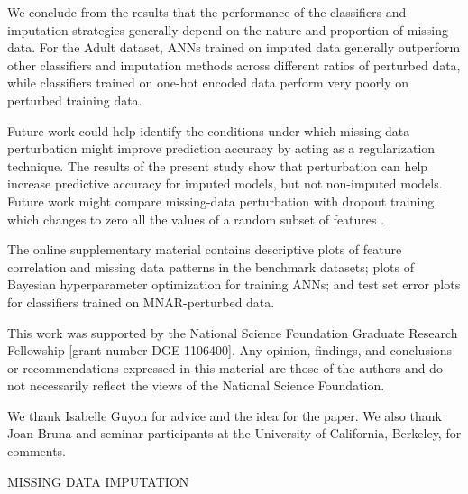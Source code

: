 \documentclass[10pt]{book}
\theoremstyle{definition}
\begin{document}
We conclude from the results that the performance of the classifiers and imputation strategies generally depend on the nature and proportion of missing data. For the Adult dataset, ANNs trained on imputed data generally outperform other classifiers and imputation methods across different ratios of perturbed data, while classifiers trained on one-hot encoded data perform very poorly on perturbed training data. 

Future work could help identify the conditions under which missing-data perturbation might improve prediction accuracy by acting as a regularization technique. The results of the present study show that perturbation can help increase predictive accuracy for imputed models, but not non-imputed models. Future work might compare missing-data perturbation with dropout training, which changes to zero all the values of a random subset of features \citep{hinton2012, maaten2013, wang2013}. 

\par
\vskip 14pt

The online supplementary material contains descriptive plots of feature correlation and missing data patterns in the benchmark datasets; plots of Bayesian hyperparameter optimization for training ANNs; and test set error plots for classifiers trained on MNAR-perturbed data. %

\par
\vskip 14pt

This work was supported by the National Science Foundation Graduate Research Fellowship [grant number DGE 1106400]. Any opinion, findings, and conclusions or recommendations expressed in this material are those of the authors and do not necessarily reflect the views of the National Science Foundation.
\par
\vskip 14pt

We thank Isabelle Guyon for advice and the idea for the paper. We also thank Joan Bruna and seminar participants at the University of California, Berkeley, for comments. %
\par
\clearpage
{\hfill {\footnotesize\rm MISSING DATA IMPUTATION} \hfill}
\end{document}
